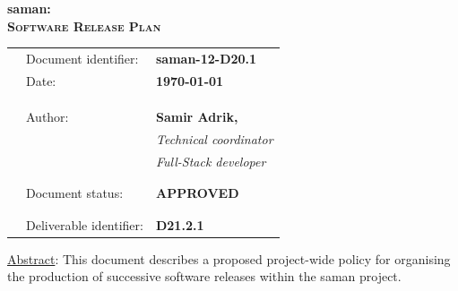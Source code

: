 \documentclass[../main.tex]{subfiles}
\begin{document}
\nopagecolor
\newpage{\pagestyle{empty}\cleardoublepage}

\newpage

\begin{center}
    \vspace*{5cm}
    \Large
    \textbf{saman:\\ \textsc{Software Release Plan}}
\end{center}

\begin{tabularx}{\textwidth}{p{5.5cm}XX}
\toprule
 & Document identifier: & \textbf{saman-12-D20.1}\\
 & Date: & \textbf{\today}\\
 &\\
 &\\
 &\\
 & Author: & \textbf{Samir Adrik,}\\
 & & \textit{Technical coordinator}\\
 & & \textit{Full-Stack developer}\\
 &\\
 &\\
 & Document status: & \textbf{APPROVED}\\
 &\\
 &\\
 & Deliverable identifier: & \textbf{D21.2.1}\\
\bottomrule
\end{tabularx}

\noindent \underline{Abstract}: This document describes a proposed project-wide policy for organising the production of successive software releases within the saman project.
\end{document}
